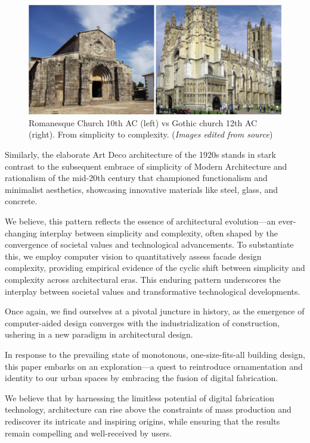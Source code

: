      \begin{figure}[htb]
          \centering
          \includegraphics[width= \linewidth]{Images/RomanesqueVsGothic}
          \caption{Romanesque Church 10th AC (left) vs Gothic church 12th AC (right). From simplicity to complexity. (\textit{Images edited from source})}
          \label{fig:RomanesquevsGothic}
        \end{figure}

Similarly, the elaborate Art Deco architecture of the 1920s stands in stark contrast to the subsequent embrace of simplicity of Modern Architecture and rationalism  of the mid-20th century that championed functionalism and minimalist aesthetics, showcasing innovative materials like steel, glass, and concrete\cite{Stacbond2020}.

We believe, this pattern reflects the essence of architectural evolution—an ever-changing interplay between simplicity and complexity, often shaped by the convergence of societal values and technological advancements.
To substantiate this, we employ computer vision to quantitatively assess facade design complexity, providing empirical evidence of the cyclic shift between simplicity and complexity across architectural eras.
This enduring pattern underscores the interplay between societal values and transformative technological developments.

Once again, we find ourselves at a pivotal juncture in history, as the emergence of computer-aided design converges with the industrialization of construction, ushering in a new paradigm in architectural design.

In response to the prevailing state of monotonous, one-size-fits-all building design, this paper embarks on an exploration—a quest to reintroduce ornamentation and identity to our urban spaces by embracing the fusion of digital fabrication.

We believe that by harnessing the limitless potential of digital fabrication technology, architecture can rise above the constraints of mass production and rediscover its intricate and inspiring origins, while ensuring that the results remain compelling and well-received by users.

